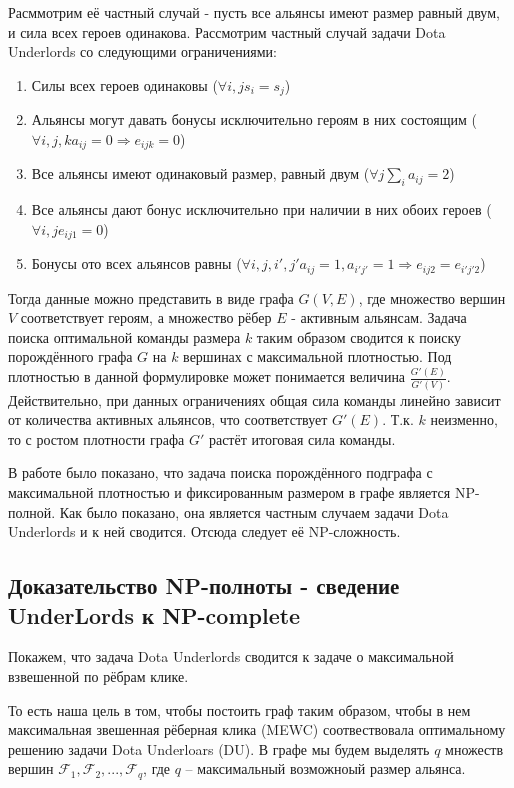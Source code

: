 \documentclass{article}
\begin{document}
Расммотрим её частный случай - пусть все альянсы имеют размер равный двум, и сила всех героев одинакова. Рассмотрим частный случай задачи Dota Underlords со следующими ограничениями:

\begin{enumerate}
    \item Силы всех героев одинаковы ($\forall i, j s_i=s_j$)
    \item Альянсы могут давать бонусы исключительно героям в них состоящим ($\forall i, j, k a_{ij}=0 \Longrightarrow e_{ijk} = 0$)
    \item Все альянсы имеют одинаковый размер, равный двум ($\forall j \sum_i a_{ij}=2$)
    \item Все альянсы дают бонус исключительно при наличии в них обоих героев ($\forall i, j e_{ij1}=0$)
    \item Бонусы ото всех альянсов равны ($\forall i, j, i', j' a_{ij}=1, a_{i' j'}=1 \Longrightarrow e_{ij2}=e_{i' j' 2}$)
\end{enumerate}

Тогда данные можно представить в виде графа $G(V, E)$, где множество вершин $V$ соответствует героям, а множество рёбер $E$ - активным альянсам. Задача поиска оптимальной команды размера $k$ таким образом сводится к поиску порождённого графа $G$ на $k$ вершинах с максимальной плотностью. Под плотностью в данной формулировке может понимается величина $\frac{G'(E)}{G'(V)}$. Действительно, при данных ограничениях общая сила команды линейно зависит от количества активных альянсов, что соответствует $G'(E)$. Т.к. $k$ неизменно, то с ростом плотности графа $G'$ растёт итоговая сила команды.

В работе \cite{downey1995fixed} было показано, что задача поиска порождённого подграфа с максимальной плотностью и фиксированным размером в графе является NP-полной. Как было показано, она является частным случаем задачи Dota Underlords и к ней сводится. Отсюда следует её NP-сложность.

\subsection{Доказательство NP-полноты - сведение UnderLords к NP-complete}
Покажем, что задача Dota Underlords сводится к задаче о максимальной взвешенной по рёбрам клике.

То есть наша цель в том, чтобы постоить граф таким образом, чтобы в нем максимальная звешенная рёберная клика (MEWC) соотвествовала оптимальному решению задачи Dota Underloars (DU).
В графе мы будем выделять $q$ множеств вершин $\mathcal{F}_1, \mathcal{F}_2, ..., \mathcal{F}_q$, где $q$ – максимальный возможноый размер альянса.   
\end{document}
